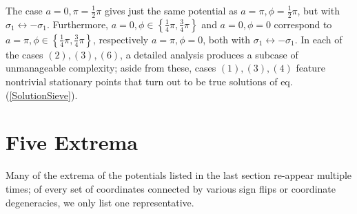 \documentclass[a4paper,12pt]{article}
\begin{document}
The case $a=0,\pi=\frac{1}{2}\pi$ gives just the same potential as
$a=\pi, \phi=\frac{1}{2}\pi$, but with
$\sigma_1\leftrightarrow-\sigma_1$.  Furthermore,
$a=0,\phi\in\left\{\frac{1}{4}\pi, \frac{3}{4}\pi\right\}$ and $a=0,
\phi=0$ correspond to $a=\pi,\phi\in\left\{\frac{1}{4}\pi,
\frac{3}{4}\pi\right\}$, respectively $a=\pi,\phi=0$, both with 
$\sigma_1\leftrightarrow-\sigma_1$. In each of the cases $(2), (3),
(6)$, a detailed analysis produces a subcase of unmanageable
complexity; aside from these, cases $(1), (3), (4)$ feature nontrivial
stationary points that turn out to be true solutions of
eq. (\ref{SolutionSieve}).

\section{Five Extrema}

Many of the extrema of the potentials listed in the last section
re-appear multiple times; of every set of coordinates connected by various
sign flips or coordinate degeneracies, we only list one representative.
\end{document}
